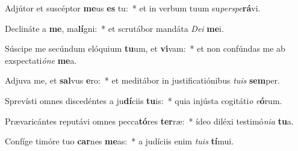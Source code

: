 \item Adjútor et suscéptor \textbf{me}us \textbf{es} tu:~* et in verbum tuum su\textit{per}\textit{spe}\textbf{rá}vi.
\item Declináte a \textbf{me}, ma\textbf{lí}gni:~* et scrutábor mandáta \textit{De}\textit{i} \textbf{me}i.
\item Súscipe me secúndum elóquium \textbf{tu}um, et \textbf{vi}vam:~* et non confúndas me ab exspectati\textit{ó}\textit{ne} \textbf{me}a.
\item Adjuva me, et \textbf{sal}vus \textbf{e}ro:~* et meditábor in justificatiónibus \textit{tu}\textit{is} \textbf{sem}per.
\item Sprevísti omnes discedéntes a ju\textbf{dí}ciis \textbf{tu}is:~* quia injústa cogitáti\textit{o} \textit{e}\textbf{ó}rum.
\item Prævaricántes reputávi omnes pecca\textbf{tó}res \textbf{ter}ræ:~* ídeo diléxi testimó\textit{ni}\textit{a} \textbf{tu}a.
\item Confíge timóre tuo \textbf{car}nes \textbf{me}as:~* a judíciis enim \textit{tu}\textit{is} \textbf{tí}mui.
